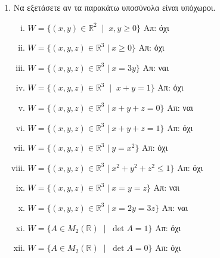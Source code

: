 


\usepackage{anyfontsize}
\pagestyle{vangelis}



\begin{center}
\end{center}

\vspace{\baselineskip}

\begin{enumerate}

    \item Να εξετάσετε αν τα παρακάτω υποσύνολα είναι υπόχωροι. 
        \begin{enumerate}[(i)]
            \item $ W = \{(x,y)\in \mathbb{R}^{2} \; \mid \; x,y \geq 0 \} $ 
                \hfill Απ: όχι 
            \item $ W = \{ (x,y,z) \in \mathbb{R}^{3} \mid x\geq 0 \} $ \hfill Απ:  όχι
            \item $ W = \{ (x,y,z) \in \mathbb{R}^{3} \mid x = 3y \} $ \hfill Απ: ναι
            \item $ W = \{ (x,y,z) \in \mathbb{R}^{3} \; \mid \; x+y=1 \} $ 
                \hfill Απ: όχι 
            \item $ W = \{ (x,y,z) \in \mathbb{R}^{3} \mid x + y + z = 0 \} $ 
                \hfill Απ: ναι
            \item $ W = \{ (x,y,z) \in \mathbb{R}^{3} \mid x + y + z = 1 \} $ 
                \hfill Απ: όχι
            \item $ W = \{ (x,y,z) \in \mathbb{R}^{3} \mid y = x^{2} \} $ 
                \hfill Απ: όχι 
            \item $ W = \{ (x,y,z) \in \mathbb{R}^{3} \mid x^{2} + y^{2} + z^{2} 
                \leq 1  \} $ \hfill Απ: όχι
            \item $ W = \{ (x,y,z) \in \mathbb{R}^{3} \mid x = y = z \} $ \hfill Απ: ναι
            \item $ W = \{ (x,y,z) \in \mathbb{R}^{3} \mid x = 2y = 3z \} $ 
                \hfill Απ: ναι 
            \item $ W = \{ A \in M_{2}(\mathbb{R}) \; \mid \; \det{A}=1 \} $ 
                \hfill Απ: όχι 
            \item $ W = \{ A \in M_{2}(\mathbb{R}) \; \mid \; \det{A}=0 \} $ 
                \hfill Απ: όχι 
        \end{enumerate}


\end{enumerate}
